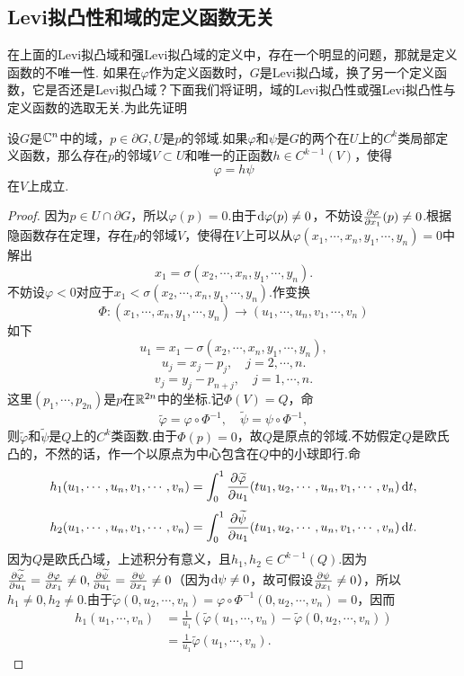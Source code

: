 \subsection{Levi拟凸性和域的定义函数无关}
在上面的Levi拟凸域和强Levi拟凸域的定义中，存在一个明显的问题，那就是定义函数的不唯一性.
如果在$\varphi$作为定义函数时，$G$是Levi拟凸域，换了另一个定义函数，它是否还是Levi拟凸域？下面我们将证明，域的Levi拟凸性或强Levi拟凸性与定义函数的选取无关.为此先证明
\begin{prop}\label{prop5.3.11}
	设$G$是$\mathbb C^n$中的域，$p\in\partial G,U$是$p$的邻域.如果$\varphi$和$\psi$是$G$的两个在$U$上的$C^k$类局部定义函数，那么存在$p$的邻域$V\subset U$和唯一的正函数$h\in C^{k-1}(V)$，使得
	\[\varphi=h\psi\]
	在$V$上成立.
\end{prop}
\begin{proof}
	因为$p\in U\cap\partial G$，所以$\varphi(p)=0$.由于$\mathop{}\!\mathrm{d}\varphi(p)\neq0$，不妨设$\frac{\partial \varphi}{\partial x_1}(p)\neq0$.根据隐函数存在定理，存在$p$的邻域$V$，使得在$V$上可以从$\varphi(x_1,\cdots,x_n,y_1,\cdots,y_n)=0$中解出
	\[x_1=\sigma(x_2,\cdots,x_n,y_1,\cdots,y_n).\]
	不妨设$\varphi<0$对应于$x_1<\sigma(x_2,\cdots,x_n,y_1,\cdots,y_n)$.作变换
	\[\Phi\colon(x_1,\cdots,x_n,y_1,\cdots,y_n)\to(u_1,\cdots,u_n,v_1,\cdots,v_n)\]
	如下
	\[u_1=x_1-\sigma(x_2,\cdots,x_n,y_1,\cdots,y_n),\]
	\[u_j=x_j-p_j,\quad j=2,\cdots,n.\]
	\[v_j=y_j-p_{n+j},\quad j=1,\cdots,n.\]
	这里$(p_1,\cdots,p_{2n})$是$p$在$\mathbb R^{2n}$中的坐标.记$\Phi(V)=Q$，命
	\[\widetilde{\varphi}=\varphi\circ\Phi^{-1},\quad \widetilde{\psi}=\psi\circ\Phi^{-1},\]
	则$\widetilde{\varphi}$和$\widetilde{\psi}$是$Q$上的$C^k$类函数.由于$\Phi(p)=0$，故$Q$是原点的邻域.不妨假定$Q$是欧氏凸的，不然的话，作一个以原点为中心包含在$Q$中的小球即行.命
	\[h_1(u_1,\cdots,u_n,v_1,\cdots,v_n)=\int_{0}^{1}\frac{\partial \widetilde{\varphi}}{\partial u_1}(tu_1,u_2,\cdots,u_n,v_1,\cdots,v_n)\mathop{}\!\mathrm{d} t,\]
	\[h_2(u_1,\cdots,u_n,v_1,\cdots,v_n)=\int_{0}^{1}\frac{\partial \widetilde{\psi}}{\partial u_1}(tu_1,u_2,\cdots,u_n,v_1,\cdots,v_n)\mathop{}\!\mathrm{d} t.\]
	因为$Q$是欧氏凸域，上述积分有意义，且$h_1,h_2\in C^{k-1}(Q)$.因为$\frac{\partial \widetilde{\varphi}}{\partial u_1}=\frac{\partial \varphi}{\partial x_1}\neq0,\frac{\partial \widetilde{\psi}}{\partial u_1}=\frac{\partial \psi}{\partial x_1}\neq0$（因为$\mathop{}\!\mathrm{d}\psi\neq0$，故可假设$\frac{\partial \psi}{\partial x_1}\neq0$），所以$h_1\neq0,h_2\neq0$.由于$\widetilde{\varphi}(0,u_2,\cdots,v_n)=\varphi\circ\Phi^{-1}(0,u_2,\cdots,v_n)=0$，因而
	\begin{align*}
		h_1(u_1,\cdots,v_n)
		&=\frac1{u_1}\left(\widetilde{\varphi}(u_1,\cdots,v_n)-\widetilde{\varphi}(0,u_2,\cdots,v_n)\right)\\
		&=\frac1{u_1}\widetilde{\varphi}(u_1,\cdots,v_n).

\end{align*}
\end{proof}
